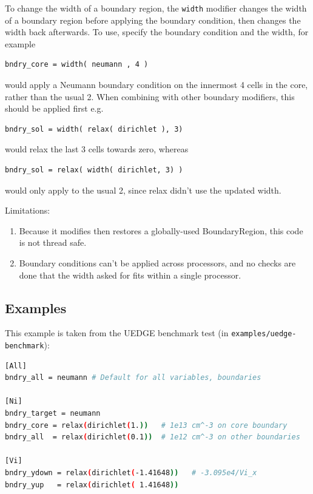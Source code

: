 \documentclass[12pt]{article}
\newcommand{\code}[1]{\texttt{#1}}
\begin{document}
To change the width of a boundary region, the \code{width} modifier
changes the width of a boundary region before applying the boundary condition,
then changes the width back afterwards. To use, specify the boundary condition and the width,
for example
\begin{lstlisting}[numbers=none]
bndry_core = width( neumann , 4 )
\end{lstlisting}
would apply a Neumann boundary condition on the innermost 4 cells in the core, rather than the usual 2.
When combining with other boundary modifiers, this should be applied first e.g.
\begin{lstlisting}[numbers=none]
bndry_sol = width( relax( dirichlet ), 3)
\end{lstlisting}
would relax the last 3 cells towards zero, whereas
\begin{lstlisting}[numbers=none]
bndry_sol = relax( width( dirichlet, 3) )
\end{lstlisting}
would only apply to the usual 2, since relax didn't use the updated width.

Limitations:
\begin{enumerate}
  \item Because it modifies then restores a globally-used BoundaryRegion,
    this code is not thread safe.

  \item Boundary conditions can't be applied across processors, and no checks
    are done that the width asked for fits within a single processor.
\end{enumerate}

\subsection{Examples}

This example is taken from the UEDGE benchmark test (in \texttt{examples/uedge-benchmark}):
\begin{lstlisting}[language=bash,numbers=none]
[All]
bndry_all = neumann # Default for all variables, boundaries

[Ni]
bndry_target = neumann
bndry_core = relax(dirichlet(1.))   # 1e13 cm^-3 on core boundary
bndry_all  = relax(dirichlet(0.1))  # 1e12 cm^-3 on other boundaries

[Vi]
bndry_ydown = relax(dirichlet(-1.41648))   # -3.095e4/Vi_x
bndry_yup   = relax(dirichlet( 1.41648))
\end{lstlisting}
\end{document}
